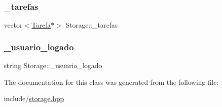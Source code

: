 \subsubsection{\texorpdfstring{\+\_\+tarefas}{\_tarefas}}
{\footnotesize\ttfamily vector$<$\hyperlink{classTarefa}{Tarefa}$\ast$$>$ Storage\+::\+\_\+tarefas\hspace{0.3cm}{\ttfamily [private]}}

\mbox{\label{classStorage_a2c715507a5c7b44e912a827faf310dc8}} 
\subsubsection{\texorpdfstring{\+\_\+usuario\+\_\+logado}{\_usuario\_logado}}
{\footnotesize\ttfamily string Storage\+::\+\_\+usuario\+\_\+logado\hspace{0.3cm}{\ttfamily [private]}}



The documentation for this class was generated from the following file\+:\begin{DoxyCompactItemize}
\item 
include/\hyperlink{storage_8hpp}{storage.\+hpp}\end{DoxyCompactItemize}
